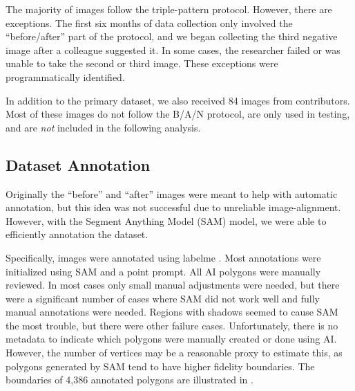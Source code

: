 \documentclass[10pt,twocolumn,letterpaper]{article}
\begin{document}
The majority of images follow the triple-pattern protocol.
However, there are exceptions.
The first six months of data collection only involved the ``before/after'' part of the protocol, and we began
  collecting the third negative image after a colleague suggested it.
In some cases, the researcher failed or was unable to take the second or third image.
These exceptions were programmatically identified.
  
In addition to the primary dataset, we also received 84 images from contributors.
Most of these images do not follow the B/A/N protocol, are only used in testing, and are
  \emph{not} included in the following analysis.


\subsection{Dataset Annotation}

Originally the ``before'' and ``after'' images were meant to help with automatic annotation, but this idea
  was not successful due to unreliable image-alignment.
However, with the Segment Anything Model (SAM) \cite{kirillov_segment_2023} model, we were able to
  efficiently annotation the dataset.

Specifically, images were annotated using labelme \cite{wada_labelmeailabelme_nodate}. 
Most annotations were initialized using SAM and a point prompt. 
All AI polygons were manually reviewed. In most cases only small manual
adjustments were needed, but there were a significant number of cases where SAM
did not work well and fully manual annotations were needed.
Regions with shadows seemed to cause SAM the most trouble, but there were other
failure cases. Unfortunately, there is no metadata to indicate which polygons
were manually created or done using AI.  However, the number of vertices may be
a reasonable proxy to estimate this, as polygons generated by SAM tend to have
higher fidelity boundaries.  
The boundaries of 4,386 annotated polygons are illustrated in .



\end{document}
